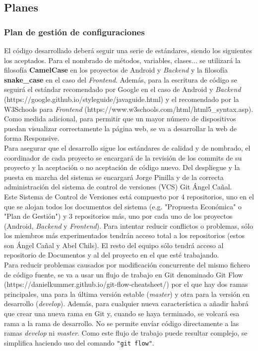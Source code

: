 \documentclass[12pt]{article}%
\begin{document}
\subsection{Planes}
\subsubsection{Plan de gesti\'on de configuraciones}

El c\'odigo desarrollado deber\'a seguir una serie de est\'andares, siendo los siguientes los aceptados. Para el nombrado de m\'etodos, variables, clases... se utilizar\'a la filosof\'ia \textbf{CamelCase} en los proyectos de Android y \textit{Backend} y la filosof\'ia \textbf{snake\_case} en el caso del \textit{Frontend}. Adem\'as, para la escritura de c\'odigo se seguir\'a el est\'andar recomendado por Google en el caso de Android y \textit{Backend} (https://google.github.io/styleguide/javaguide.html) y el recomendado por la W3Schools para \textit{Frontend} (https://www.w3schools.com/html/html5\_syntax.asp). Como medida adicional, para permitir que un mayor n\'umero de dispositivos puedan visualizar correctamente la p\'agina web, se va a desarrollar la web de forma Responsive.\\

Para asegurar que el desarrollo sigue los est\'andares de calidad y de nombrado, el coordinador de cada proyecto se encargar\'a de la revisi\'on de los commits de su proyecto y la aceptaci\'on o no aceptaci\'on de c\'odigo nuevo. Del despliegue y la puesta en marcha del sistema se encargar\'a Jorge Pinilla y de la correcta administraci\'on del sistema de control de versiones (VCS) Git \'Angel Ca\~nal.\\

Este Sistema de Control de Versiones est\'a compuesto por 4 repositorios, uno en el que se alojan todos los documentos del sistema (e.g. "Propuesta Econ\'omica" o "Plan de Gesti\'on") y 3 repositorios m\'as, uno por cada uno de los proyectos (Android, \textit{Backend} y \textit{Frontend}). Para intentar reducir conflictos o problemas, s\'olo los miembros m\'as experimentados tendr\'an acceso total a los repositorios (estos son \'Angel Ca\~nal y Abel Chils). El resto del equipo s\'olo tendr\'a acceso al repositorio de Documentos y al del proyecto en el que est\'e trabajando. \\

Para reducir problemas causados por modificaci\'on concurrente del mismo fichero de c\'odigo fuente, se va a usar un flujo de trabajo en Git denominado Git Flow (https://danielkummer.github.io/git-flow-cheatsheet/) por el que hay dos ramas principales, una para la \'ultima versi\'on estable (\textit{master}) y otra para la versi\'on en desarrollo (\textit{develop}). Adem\'as, para cualquier nueva caracter\'istica a a\~nadir habr\'a que crear una nueva rama en Git y, cuando se haya terminado, se volcar\'a esa rama a la rama de desarrollo. No se permite env\'iar c\'odigo directamente a las ramas \textit{develop} ni \textit{master}. Como este flujo de trabajo puede resultar complejo, se simplifica haciendo uso del comando \lstinline{"git flow"}.\\
\end{document}
